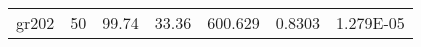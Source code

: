 \documentclass{llncs}
\begin{document}
\begin{center}
\begin{longtable}{|l|l|l|l|l|l|l|}
\hline	gr202	&	50	&	99.74	&	33.36	&	600.629	&	0.8303	&	1.279E-05	\\

\end{longtable}
\end{center}
\end{document}
